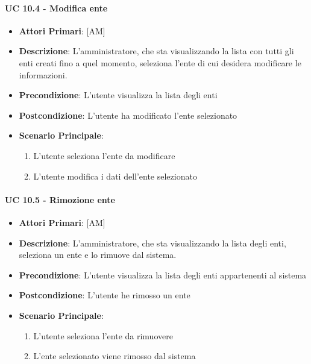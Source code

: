 			\paragraph{UC 10.4 - Modifica ente}
			\begin{itemize}
				\item \textbf{Attori Primari}: [AM]
				\item \textbf{Descrizione}: L'amministratore, che sta visualizzando la lista con tutti gli enti creati fino a quel momento, seleziona l'ente di cui desidera modificare le informazioni. 
				\item \textbf{Precondizione}: L'utente visualizza la lista degli enti
				\item \textbf{Postcondizione}: L'utente ha modificato l'ente selezionato
				\item \textbf{Scenario Principale}:
				\begin{enumerate}
					\item{L'utente seleziona l'ente da modificare}
					\item{L'utente modifica i dati dell'ente selezionato}
				\end{enumerate}
			\end{itemize}	

			\paragraph{UC 10.5 - Rimozione ente}
			\begin{itemize}
				\item \textbf{Attori Primari}: [AM]
				\item \textbf{Descrizione}: L'amministratore, che sta visualizzando la lista degli enti, seleziona un ente e lo rimuove dal sistema.
				\item \textbf{Precondizione}: L'utente visualizza la lista degli enti appartenenti al sistema
				\item \textbf{Postcondizione}: L'utente he rimosso un ente
				\item \textbf{Scenario Principale}:
				\begin{enumerate}
					\item{L'utente seleziona l'ente da rimuovere}
					\item{L'ente selezionato viene rimosso dal sistema}
				\end{enumerate}	
			\end{itemize}		

